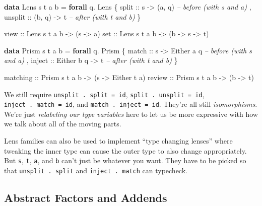 \documentclass[]{article}
\newenvironment{Shaded}{}{}
\newcommand{\CommentTok}[1]{\textcolor[rgb]{0.38,0.63,0.69}{\textit{#1}}}
\newcommand{\DataTypeTok}[1]{\textcolor[rgb]{0.56,0.13,0.00}{#1}}
\newcommand{\FunctionTok}[1]{\textcolor[rgb]{0.02,0.16,0.49}{#1}}
\newcommand{\KeywordTok}[1]{\textcolor[rgb]{0.00,0.44,0.13}{\textbf{#1}}}
\newcommand{\NormalTok}[1]{#1}
\newcommand{\OtherTok}[1]{\textcolor[rgb]{0.00,0.44,0.13}{#1}}
\begin{document}
\begin{Shaded}
\begin{Highlighting}[]
\KeywordTok{data} \DataTypeTok{Lens}\NormalTok{ s t a b }\FunctionTok{=} \KeywordTok{forall}\NormalTok{ q}\FunctionTok{.} \DataTypeTok{Lens}
\NormalTok{    \{}\OtherTok{ split   ::}\NormalTok{ s }\OtherTok{->}\NormalTok{ (a, q)        }\CommentTok{-- before (with s and a)}
\NormalTok{    ,}\OtherTok{ unsplit ::}\NormalTok{ (b, q) }\OtherTok{->}\NormalTok{ t        }\CommentTok{-- after  (with t and b)}
\NormalTok{    \}}

\OtherTok{view ::} \DataTypeTok{Lens}\NormalTok{ s t a b }\OtherTok{->}\NormalTok{ (s }\OtherTok{->}\NormalTok{ a)}
\OtherTok{set  ::} \DataTypeTok{Lens}\NormalTok{ s t a b }\OtherTok{->}\NormalTok{ (b }\OtherTok{->}\NormalTok{ s }\OtherTok{->}\NormalTok{ t)}

\KeywordTok{data} \DataTypeTok{Prism}\NormalTok{ s t a b }\FunctionTok{=} \KeywordTok{forall}\NormalTok{ q}\FunctionTok{.} \DataTypeTok{Prism}
\NormalTok{    \{}\OtherTok{ match  ::}\NormalTok{ s }\OtherTok{->} \DataTypeTok{Either}\NormalTok{ a q     }\CommentTok{-- before (with s and a)}
\NormalTok{    ,}\OtherTok{ inject ::} \DataTypeTok{Either}\NormalTok{ b q }\OtherTok{->}\NormalTok{ t     }\CommentTok{-- after  (with t and b)}
\NormalTok{    \}}

\OtherTok{matching ::} \DataTypeTok{Prism}\NormalTok{ s t a b }\OtherTok{->}\NormalTok{ (s }\OtherTok{->} \DataTypeTok{Either}\NormalTok{ t a)}
\OtherTok{review   ::} \DataTypeTok{Prism}\NormalTok{ s t a b }\OtherTok{->}\NormalTok{ (b }\OtherTok{->}\NormalTok{ t)}
\end{Highlighting}
\end{Shaded}

We still require \texttt{unsplit\ .\ split\ =\ id},
\texttt{split\ .\ unsplit\ =\ id}, \texttt{inject\ .\ match\ =\ id}, and
\texttt{match\ .\ inject\ =\ id}. They're all still \emph{isomorphisms}. We're
just \emph{relabeling our type variables} here to let us be more expressive with
how we talk about all of the moving parts.

Lens families can also be used to implement ``type changing lenses'' where
tweaking the inner type can cause the outer type to also change appropriately.
But \texttt{s}, \texttt{t}, \texttt{a}, and \texttt{b} can't just be whatever
you want. They have to be picked so that \texttt{unsplit\ .\ split} and
\texttt{inject\ .\ match} can typecheck.

\hypertarget{abstract-factors-and-addends}{%
\subsection{Abstract Factors and Addends}\label{abstract-factors-and-addends}}
\end{document}
